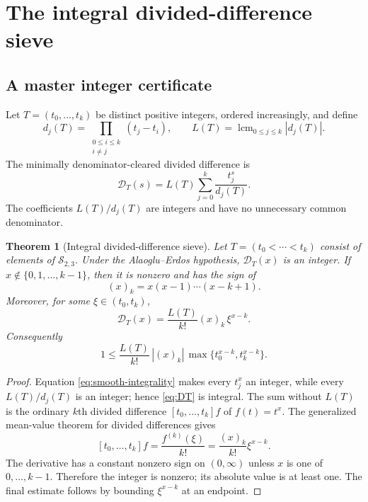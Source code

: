 \documentclass[11pt]{article}
\newtheorem{theorem}{Theorem}[section]
\theoremstyle{definition}
\theoremstyle{remark}
\newcommand{\Ssmooth}{\mathcal S_{2,3}}
\newcommand{\lcmop}{\operatorname{lcm}}
\newcommand{\fall}[2]{(#1)_{#2}}
\begin{document}
\section{The integral divided-difference sieve}\label{sec:dd}

\subsection{A master integer certificate}

Let $T=(t_0,\ldots,t_k)$ be distinct positive integers, ordered increasingly, and define
\[
 d_j(T)=\prod_{\substack{0\le i\le k\\i\ne j}}(t_j-t_i),
 \qquad
 L(T)=\lcmop_{0\le j\le k}|d_j(T)|.
\]
The minimally denominator-cleared divided difference is
\begin{equation}\label{eq:DT}
 \mathscr D_T(s)=L(T)\sum_{j=0}^{k}\frac{t_j^s}{d_j(T)}.
\end{equation}
The coefficients $L(T)/d_j(T)$ are integers and have no unnecessary common denominator.

\begin{theorem}[Integral divided-difference sieve]\label{thm:dd-master}
Let $T=(t_0<\cdots<t_k)$ consist of elements of $\Ssmooth$. Under the Alaoglu--Erdos hypothesis, $\mathscr D_T(x)$ is an integer. If $x\notin\{0,1,\ldots,k-1\}$, then it is nonzero and has the sign of
\[
 \fall{x}{k}=x(x-1)\cdots(x-k+1).
\]
Moreover, for some $\xi\in(t_0,t_k)$,
\begin{equation}\label{eq:dd-mvt}
 \mathscr D_T(x)=\frac{L(T)}{k!}\fall{x}{k}\,\xi^{x-k}.
\end{equation}
Consequently
\begin{equation}\label{eq:dd-gap}
 1\le \frac{L(T)}{k!}\,|\fall{x}{k}|\,
 \max\{t_0^{x-k},t_k^{x-k}\}.
\end{equation}
\end{theorem}

\begin{proof}
Equation \eqref{eq:smooth-integrality} makes every $t_j^x$ an integer, while every $L(T)/d_j(T)$ is an integer; hence \eqref{eq:DT} is integral. The sum without $L(T)$ is the ordinary $k$th divided difference $[t_0,\ldots,t_k]f$ of $f(t)=t^x$. The generalized mean-value theorem for divided differences gives
\[
 [t_0,\ldots,t_k]f=\frac{f^{(k)}(\xi)}{k!}
 =\frac{\fall{x}{k}}{k!}\xi^{x-k}.
\]
The derivative has a constant nonzero sign on $(0,\infty)$ unless $x$ is one of $0,\ldots,k-1$. Therefore the integer is nonzero; its absolute value is at least one. The final estimate follows by bounding $\xi^{x-k}$ at an endpoint.
\end{proof}
\end{document}
